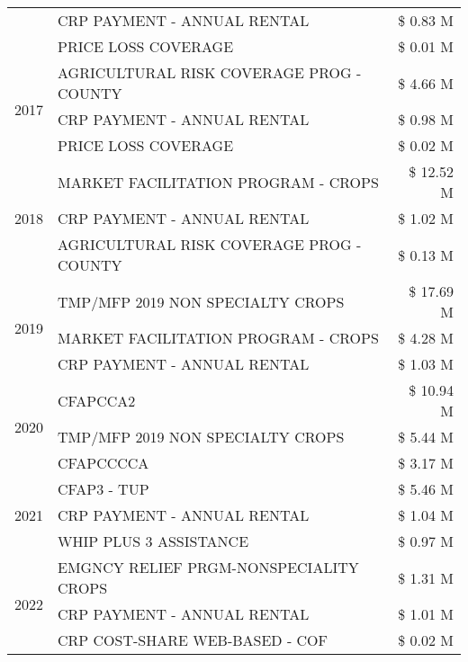 \begin{tabular}{llr}
 & CRP PAYMENT - ANNUAL RENTAL & \$ 0.83 M \\
 & PRICE LOSS COVERAGE & \$ 0.01 M \\
\cline{1-3}
\multirow[t]{3}{*}{2017} & AGRICULTURAL RISK COVERAGE PROG - COUNTY & \$ 4.66 M \\
 & CRP PAYMENT - ANNUAL RENTAL & \$ 0.98 M \\
 & PRICE LOSS COVERAGE & \$ 0.02 M \\
\cline{1-3}
\multirow[t]{3}{*}{2018} & MARKET FACILITATION PROGRAM - CROPS & \$ 12.52 M \\
 & CRP PAYMENT - ANNUAL RENTAL & \$ 1.02 M \\
 & AGRICULTURAL RISK COVERAGE PROG - COUNTY & \$ 0.13 M \\
\cline{1-3}
\multirow[t]{3}{*}{2019} & TMP/MFP 2019 NON SPECIALTY CROPS & \$ 17.69 M \\
 & MARKET FACILITATION PROGRAM - CROPS & \$ 4.28 M \\
 & CRP PAYMENT - ANNUAL RENTAL & \$ 1.03 M \\
\cline{1-3}
\multirow[t]{3}{*}{2020} & CFAPCCA2 & \$ 10.94 M \\
 & TMP/MFP 2019 NON SPECIALTY CROPS & \$ 5.44 M \\
 & CFAPCCCCA & \$ 3.17 M \\
\cline{1-3}
\multirow[t]{3}{*}{2021} & CFAP3 - TUP & \$ 5.46 M \\
 & CRP PAYMENT - ANNUAL RENTAL & \$ 1.04 M \\
 & WHIP PLUS 3 ASSISTANCE & \$ 0.97 M \\
\cline{1-3}
\multirow[t]{3}{*}{2022} & EMGNCY RELIEF PRGM-NONSPECIALITY CROPS & \$ 1.31 M \\
 & CRP PAYMENT - ANNUAL RENTAL & \$ 1.01 M \\
 & CRP COST-SHARE WEB-BASED - COF & \$ 0.02 M \\
\cline{1-3}
\bottomrule
\end{tabular}
